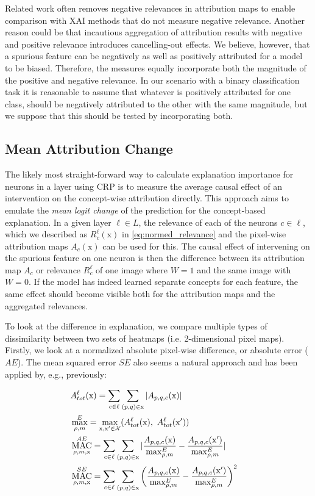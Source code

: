 Related work often removes negative relevances in attribution maps to enable comparison with XAI methods that do not measure negative relevance. Another reason could be that incautious aggregation of attribution results with negative and positive relevance introduces cancelling-out effects. We believe, however, that a spurious feature can be negatively as well as positively attributed for a model to be biased. Therefore, the measures equally incorporate both the magnitude of the positive and negative relevance. In our scenario with a binary classification task it is reasonable to assume that whatever is positively attributed for one class, should be negatively attributed to the other with the same magnitude, but we suppose that this should be tested by incorporating both.

\subsection{Mean Attribution Change}\label{section:measure_mac}
The likely most straight-forward way to calculate explanation importance for neurons in a layer using CRP is to measure the average causal effect of an intervention on the concept-wise attribution directly. This approach aims to emulate the \textit{mean logit change} of the prediction for the concept-based explanation. In a given layer $\ell \in L$, the relevance of each of the neurons $c \in \ell$, which we described as $R_c^{\ell}(\mathrm{x})$ in \cref{eq:normed_relevance} and the pixel-wise attribution maps $A_c(\mathrm{x})$ can be used for this.
The causal effect of intervening on the spurious feature on one neuron is then the difference between its attribution map $A_c$ or relevance $R_c^{\ell}$ of one image where $W=1$ and the same image with $W=0$. If the model has indeed learned separate concepts for each feature, the same effect should become visible both for the attribution maps and the aggregated relevances.

To look at the difference in explanation, we compare multiple types of dissimilarity between two sets of heatmaps (i.e. 2-dimensional pixel maps). Firstly, we look at a normalized absolute pixel-wise difference, or absolute error ($AE$). The mean squared error $SE$ also seems a natural approach and has been applied by, e.g., \citet{Karimi2023} previously: 

\begin{align}
\displaystyle 
& A_{tot}^{\ell}(\mathrm{x}) = \sum_{c \in \ell} \sum_{(p,q) \in \mathrm{x}} |A_{p,q,c}(\mathrm{x})|  \label{eq:tot_abs_norm1} & \\
& \max_{\rho, m}^E = \max_{\mathrm{x},\mathrm{x'} \in \mathcal{X}} (A_{tot}^{\ell}(\mathrm{x}) , \  A_{tot}^{\ell}(\mathrm{x'}) ) \label{eq:tot_abs_norm2}  & \\
& \operatorname*{MAC}_{\rho, m, \mathrm{x}}^{AE} = 
\sum_{c \in \ell} \sum_{(p,q) \in \mathrm{x}}| \frac{A_{p,q,c}(\mathrm{x})}{\max_{\rho, m}^E} -\frac{A_{p,q,c}(\mathrm{x'})}{\max_{\rho, m}^E}| & \\
& \operatorname*{MAC}_{\rho, m, \mathrm{x}}^{SE} = 
\sum_{c \in \ell} \sum_{(p,q) \in \mathrm{x}} \left( \frac{A_{p,q,c}(\mathrm{x})}{\max_{\rho, m}^E} -\frac{A_{p,q,c}(\mathrm{x'})}{\max_{\rho, m}^E}\right) ^2 & 
\end{align}

